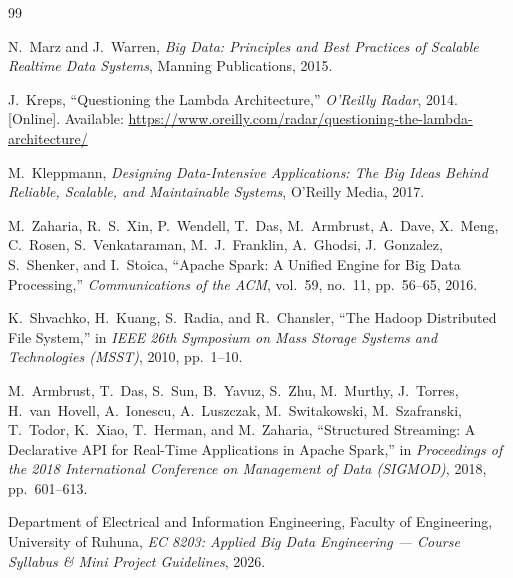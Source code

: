 \documentclass[11pt,a4paper]{article}
\begin{document}
\begin{thebibliography}{99}

N.~Marz and J.~Warren, \emph{Big Data: Principles and Best Practices of Scalable Realtime Data Systems}, Manning Publications, 2015.

J.~Kreps, ``Questioning the Lambda Architecture,'' \emph{O'Reilly Radar}, 2014. [Online]. Available: \url{https://www.oreilly.com/radar/questioning-the-lambda-architecture/}

M.~Kleppmann, \emph{Designing Data-Intensive Applications: The Big Ideas Behind Reliable, Scalable, and Maintainable Systems}, O'Reilly Media, 2017.

M.~Zaharia, R.~S.~Xin, P.~Wendell, T.~Das, M.~Armbrust, A.~Dave, X.~Meng, C.~Rosen, S.~Venkataraman, M.~J.~Franklin, A.~Ghodsi, J.~Gonzalez, S.~Shenker, and I.~Stoica, ``Apache Spark: A Unified Engine for Big Data Processing,'' \emph{Communications of the ACM}, vol.~59, no.~11, pp.~56--65, 2016.

K.~Shvachko, H.~Kuang, S.~Radia, and R.~Chansler, ``The Hadoop Distributed File System,'' in \emph{IEEE 26th Symposium on Mass Storage Systems and Technologies (MSST)}, 2010, pp.~1--10.

M.~Armbrust, T.~Das, S.~Sun, B.~Yavuz, S.~Zhu, M.~Murthy, J.~Torres, H.~van~Hovell, A.~Ionescu, A.~Luszczak, M.~Switakowski, M.~Szafranski, T.~Todor, K.~Xiao, T.~Herman, and M.~Zaharia, ``Structured Streaming: A Declarative API for Real-Time Applications in Apache Spark,'' in \emph{Proceedings of the 2018 International Conference on Management of Data (SIGMOD)}, 2018, pp.~601--613.

Department of Electrical and Information Engineering, Faculty of Engineering, University of Ruhuna, \emph{EC 8203: Applied Big Data Engineering --- Course Syllabus \& Mini Project Guidelines}, 2026.

\end{thebibliography}
\end{document}
